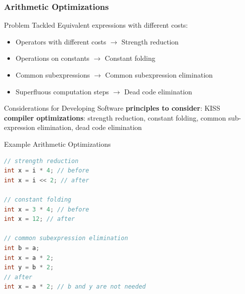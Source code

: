 \begin{frame}[fragile]
	\frametitle{Arithmetic Optimizations}
	\begin{fancycolumns}
		\begin{motivation}{Problem Tackled}
			Equivalent expressions with different costs:
			\begin{itemize}
				\item Operators with different costs $\rightarrow$ Strength reduction
				\item Operations on constants $\rightarrow$ Constant folding
				\item Common subexpressions $\rightarrow$ Common subexpression elimination
				\item Superfluous computation steps $\rightarrow$ Dead code elimination
			\end{itemize}
		\end{motivation}
		\begin{note}{Considerations for Developing Software}
			\textbf{principles to consider}: KISS \\\textbf{compiler optimizations}: strength reduction, constant folding, common sub-expression elimination, dead code elimination
		\end{note}
		\nextcolumn
		\begin{example}{Example Arithmetic Optimizations}
			\begin{lstlisting}[language=Java,basicstyle=\footnotesize]
// strength reduction
int x = i * 4; // before
int x = i << 2; // after

// constant folding
int x = 3 * 4; // before
int x = 12; // after

// common subexpression elimination
int b = a;
int x = a * 2;
int y = b * 2;
// after
int x = a * 2; // b and y are not needed
			\end{lstlisting}
		\end{example}
	\end{fancycolumns}
\end{frame}

